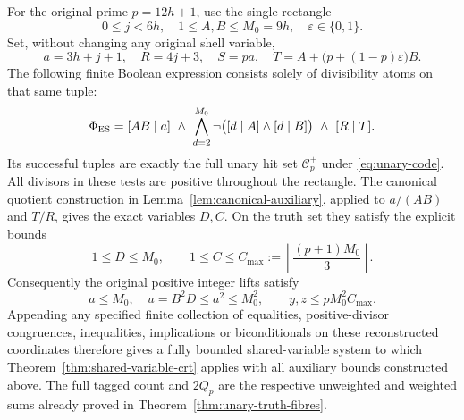 \begin{corollary}
\label{cor:actual-prime-truth-system}
For the original prime \(p=12h+1\), use the single rectangle
\[
 0\le j<6h,\quad 1\le A,B\le M_0=9h,\quad
 \varepsilon\in\{0,1\}.
\]
Set, without changing any original shell variable,
\[
 a=3h+j+1,\quad R=4j+3,\quad S=pa,\quad
 T=A+\bigl(p+(1-p)\varepsilon\bigr)B.
\]
The following finite Boolean expression consists solely of
divisibility atoms on that same tuple:
\begin{equation}\label{eq:actual-prime-boolean}
 \Phi_{\rm ES}=
 [AB\mid a]\ \land\
 \bigwedge_{d=2}^{M_0}
       \neg\bigl([d\mid A]\land[d\mid B]\bigr)
       \ \land\ [R\mid T].
\end{equation}
Its successful tuples are exactly the full unary hit set
\(\mathcal C_p^+\) under \eqref{eq:unary-code}.
All divisors in these tests are positive throughout the rectangle.
The canonical quotient construction in
Lemma~\ref{lem:canonical-auxiliary}, applied to \(a/(AB)\)
and \(T/R\), gives the exact variables \(D,C\).
On the truth set they satisfy the explicit bounds
\[
 1\le D\le M_0,\qquad
 1\le C\le C_{\max}:=\left\lfloor\frac{(p+1)M_0}{3}\right\rfloor .
\]
Consequently the original positive integer lifts satisfy
\[
 a\le M_0,\quad u=B^2D\le a^2\le M_0^2,\qquad
 y,z\le pM_0^2C_{\max}.
\]
Appending any specified finite collection of equalities,
positive-divisor congruences, inequalities, implications or
biconditionals on these reconstructed coordinates therefore
gives a fully bounded shared-variable system to which
Theorem~\ref{thm:shared-variable-crt} applies with all
auxiliary bounds constructed above.
The full tagged count and \(2Q_p\) are the respective
unweighted and weighted sums already proved in
Theorem~\ref{thm:unary-truth-fibres}.
\end{corollary}
